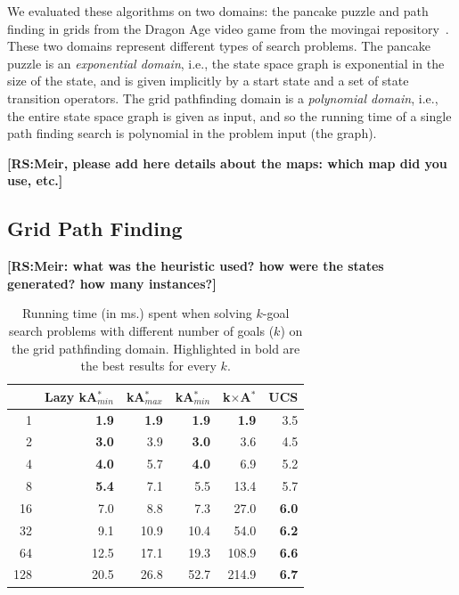 \documentclass{aicom2e}
\newcommand{\kgs}{$k$-goal search}
\newcommand{\kastarmin}{kA$^*_{min}$}
\newcommand{\kastarmax}{kA$^*_{max}$}
\newcommand{\kxastar}{k$\times$A$^*$}
\newcommand{\roni}[1]{\textbf{[RS:#1]}}
\begin{document}
We evaluated these algorithms on two domains: the pancake puzzle and path finding in grids from the Dragon Age video game from the movingai repository~\cite{sturtevant2012benchmarks}. These two domains represent different types of search problems. The pancake puzzle is an {\em exponential domain}, i.e., the state space graph is exponential in the size of the state, and is given implicitly by a start state and a set of state transition operators. The grid pathfinding domain is a {\em polynomial domain}, i.e., the entire state space graph is given as input, and so the running time of a single path finding search is polynomial in the problem input (the graph). 

\roni{Meir, please add here details about the maps: which map did you use, etc.}
\subsection{Grid Path Finding}
\roni{Meir: what was the heuristic used? how were the states generated? how many instances?}

\begin{table}[]
    \centering
    \begin{tabular}{|r|r|r|r|r|r|}
    \hline
        & \multicolumn{1}{c|}{Lazy \kastarmin{}} & \kastarmax &      \kastarmin       &  \kxastar & UCS       \\

        \hline
1     & \textbf{1.9}                 & \textbf{1.9} & \textbf{1.9} & \textbf{1.9} & 3.5          \\
2     & \textbf{3.0}                 & 3.9          & \textbf{3.0} & 3.6          & 4.5          \\
4     & \textbf{4.0}                 & 5.7          & \textbf{4.0} & 6.9          & 5.2          \\
8     & \textbf{5.4}                 & 7.1          & 5.5          & 13.4         & 5.7          \\
16    & 7.0                          & 8.8          & 7.3          & 27.0         & \textbf{6.0} \\
32    & 9.1                          & 10.9         & 10.4         & 54.0         & \textbf{6.2} \\
64    & 12.5                         & 17.1         & 19.3         & 108.9        & \textbf{6.6} \\
128   & 20.5                         & 26.8         & 52.7         & 214.9 &
\textbf{6.7}\\
\hline
    \end{tabular}
    \caption{Running time (in ms.) spent when solving \kgs{} problems with different number of goals ($k$) on the grid pathfinding domain. Highlighted in bold are the best results for every $k$.}
    \label{tab:pathfinding-runtime}
\end{table}
\end{document}
